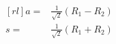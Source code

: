%
%

\begin{equation}
\begin{aligned}[rl]
a =& \frac{1}{\sqrt{2}} (R_1 - R_2) \\
s =& \frac{1}{\sqrt{2}} (R_1 + R_2)
\end{aligned}
\label{eq:symm}
\end{equation}

%